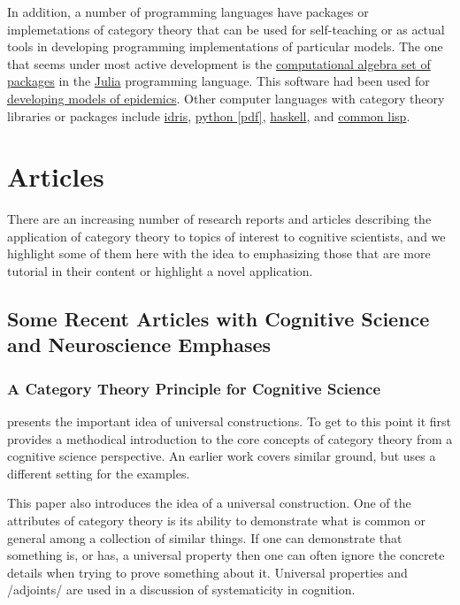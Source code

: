 \documentclass{article}
\begin{document}
In addition, a number of programming languages have packages or implemetations of category theory that can be used for self-teaching or as actual tools in developing programming implementations of particular models. The one that seems under most active development is the \href{https://www.algebraicjulia.org/}{computational algebra set of packages} in the \href{https://julialang.org/}{Julia} programming language. This software had been used for \href{https://arxiv.org/abs/2203.16345}{developing models of epidemics}. Other computer languages with category theory libraries or packages include \href{https://github.com/statebox/idris-ct}{idris}, \href{https://arxiv.org/pdf/2005.02975.pdf}{python [pdf]}, \href{https://github.com/sjoerdvisscher/data-category}{haskell}, and \href{https://european-lisp-symposium.org/static/proceedings/2010.pdf}{common lisp}. 

\section{Articles}
\label{sec:articles}

There are an increasing number of research reports and articles describing the application of category theory to topics of interest to cognitive scientists, and we highlight some of them here with the idea to emphasizing those that are more tutorial in their content or highlight a novel application.

\subsection{Some Recent Articles with Cognitive Science and Neuroscience Emphases}
\label{subsec:actRevArts}

\subsubsection{A Category Theory Principle for Cognitive Science}
\textcite{phillips21_categ_theor_princ_cognit_scien} presents the important idea of universal constructions. To get to this point it first provides a methodical introduction to the core concepts of category theory from a cognitive science perspective. An earlier work \autocite{phillips2014category} covers similar ground, but uses a different setting for the examples.

This paper also introduces the idea of a universal construction. One of the attributes of category theory is its ability to demonstrate what is common or general among a collection of similar things. If one can demonstrate that something is, or has, a universal property then one can often ignore the concrete details when trying to prove something about it. Universal properties and /adjoints/ are used in a discussion of systematicity in cognition. 
\end{document}
